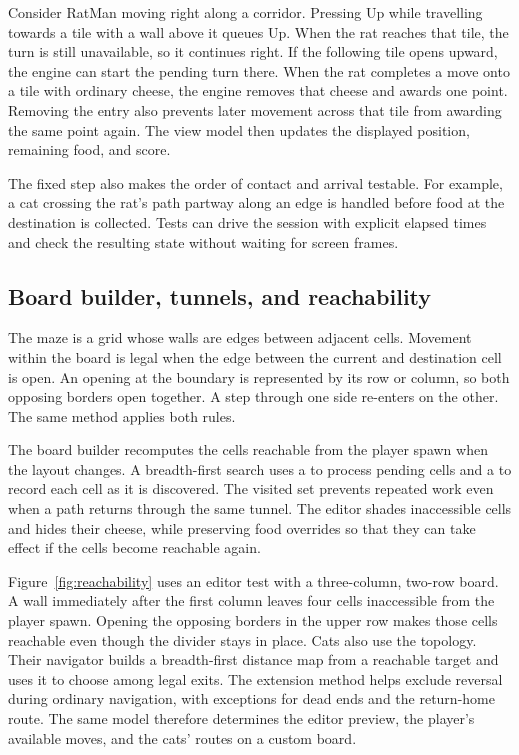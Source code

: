 Consider RatMan moving right along a corridor. Pressing Up while travelling towards a tile with a wall above it queues Up. When the rat reaches that tile, the turn is still unavailable, so it continues right. If the following tile opens upward, the engine can start the pending turn there. When the rat completes a move onto a tile with ordinary cheese, the engine removes that cheese and awards one point. Removing the entry also prevents later movement across that tile from awarding the same point again. The view model then updates the displayed position, remaining food, and score.

The fixed step also makes the order of contact and arrival testable. For example, a cat crossing the rat's path partway along an edge is handled before food at the destination is collected. Tests can drive the session with explicit elapsed times and check the resulting state without waiting for screen frames.


\clearpage
\subsection{Board builder, tunnels, and reachability}

The maze is a grid whose walls are edges between adjacent cells. Movement within the board is legal when the edge between the current and destination cell is open. An opening at the boundary is represented by its row or column, so both opposing borders open together. A step through one side re-enters on the other. The same  method applies both rules.

The board builder recomputes the cells reachable from the player spawn when the layout changes. A breadth-first search uses a  to process pending cells and a  to record each cell as it is discovered. The visited set prevents repeated work even when a path returns through the same tunnel. The editor shades inaccessible cells and hides their cheese, while preserving food overrides so that they can take effect if the cells become reachable again.

Figure~\ref{fig:reachability} uses an editor test with a three-column, two-row board. A wall immediately after the first column leaves four cells inaccessible from the player spawn. Opening the opposing borders in the upper row makes those cells reachable even though the divider stays in place. Cats also use the topology. Their navigator builds a breadth-first distance map from a reachable target and uses it to choose among legal exits. The  extension method helps exclude reversal during ordinary navigation, with exceptions for dead ends and the return-home route. The same model therefore determines the editor preview, the player's available moves, and the cats' routes on a custom board.

